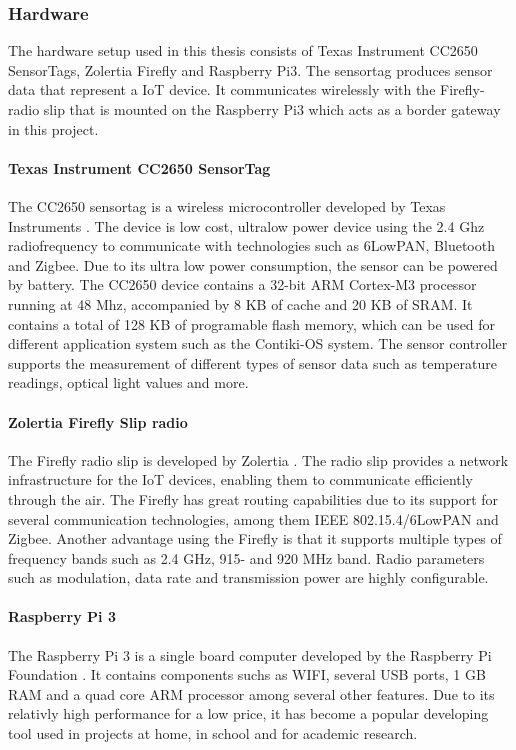 \subsubsection{Hardware}
The hardware setup used in this thesis consists of Texas Instrument CC2650 SensorTags, Zolertia Firefly and Raspberry Pi3. The sensortag produces sensor data that represent a IoT device. It communicates wirelessly with the Firefly-radio slip that is mounted on the Raspberry Pi3 which acts as a border gateway in this project. 

\paragraph{Texas Instrument CC2650 SensorTag}
The CC2650 sensortag is a wireless microcontroller developed by Texas Instruments \cite{CC2650}. The device is low cost, ultralow power device using the 2.4 Ghz radiofrequency to communicate with technologies such as 6LowPAN, Bluetooth and Zigbee. Due to its ultra low power consumption, the sensor can be powered by battery.
The CC2650 device contains a 32-bit ARM Cortex-M3 processor running at 48 Mhz, accompanied by 8 KB of cache and 20 KB of SRAM. It contains a total of 128 KB of programable flash memory, which can be used for different application system such as the Contiki-OS system. The sensor controller supports the measurement of different types of sensor data such as temperature readings, optical light values and more. 


\paragraph{Zolertia Firefly Slip radio}
The Firefly radio slip is developed by Zolertia \cite{Firefly}. The radio slip provides a network infrastructure for the IoT devices, enabling them to communicate efficiently through the air. The Firefly has great routing capabilities due to its support for several communication technologies, among them IEEE 802.15.4/6LowPAN and Zigbee. Another advantage using the Firefly is that it supports multiple types of frequency bands such as 2.4 GHz, 915- and 920 MHz band. Radio parameters such as modulation, data rate and transmission power are highly configurable.

\paragraph{Raspberry Pi 3}
The Raspberry Pi 3 is a single board computer developed by the Raspberry Pi Foundation \cite{RP3}. It contains components suchs as WIFI, several USB ports, 1 GB RAM and a quad core ARM processor among several other features. Due to its relativly high performance for a low price, it has become a popular developing tool used in projects at home, in school and for academic research.